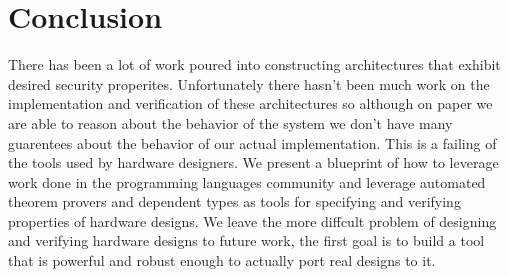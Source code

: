 \documentclass[12pt, titlepage]{article}
\begin{document}

\section{Conclusion}

There has been a lot of work poured into constructing architectures that exhibit desired security properites. Unfortunately there hasn't been
much work on the implementation and verification of these architectures so although on paper we are able to reason about the behavior of the
system we don't have many guarentees about the behavior of our actual implementation. This is a failing of the tools used by hardware
designers. We present a blueprint of how to leverage work done in the programming languages community and leverage automated theorem provers
and dependent types as tools for specifying and verifying properties of hardware designs. We leave the more diffcult problem of designing and
verifying hardware designs to future work, the first goal is to build a tool that is powerful and robust enough to actually port real designs
to it.



\end{document}
